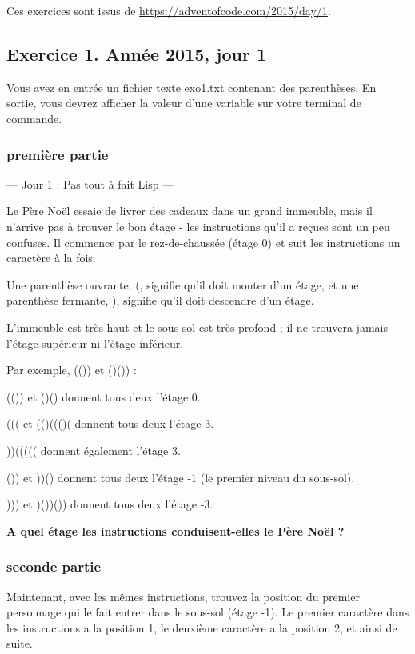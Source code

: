 
Ces exercices sont issus de \url{https://adventofcode.com/2015/day/1}.

\subsection{Exercice 1. Année 2015, jour 1}


Vous avez en entrée un fichier texte exo1.txt contenant des parenthèses.
En sortie, vous devrez afficher la valeur d'une variable sur votre terminal de commande.

\subsubsection{première partie}

--- Jour 1 : Pas tout à fait Lisp ---

Le Père Noël essaie de livrer des cadeaux dans un grand immeuble, mais il n'arrive pas à trouver le bon étage - les instructions qu'il a reçues sont un peu confuses. Il commence par le rez-de-chaussée (étage 0) et suit les instructions un caractère à la fois.

Une parenthèse ouvrante, (, signifie qu'il doit monter d'un étage, et une parenthèse fermante, ), signifie qu'il doit descendre d'un étage.

L'immeuble est très haut et le sous-sol est très profond ; il ne trouvera jamais l'étage supérieur ni l'étage inférieur.

Par exemple, (()) et ()()) :

    (()) et ()() donnent tous deux l'étage 0.

    ((( et (()((()( donnent tous deux l'étage 3.
    
    ))((((( donnent également l'étage 3.
    
    ()) et ))() donnent tous deux l'étage -1 (le premier niveau du sous-sol).
    
    ))) et )())()) donnent tous deux l'étage -3.

\textbf{A quel étage les instructions conduisent-elles le Père Noël ?}

\subsubsection{seconde partie}

Maintenant, avec les mêmes instructions, trouvez la position du premier personnage qui le fait entrer dans le sous-sol (étage -1). Le premier caractère dans les instructions a la position 1, le deuxième caractère a la position 2, et ainsi de suite.

